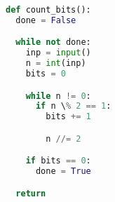 \begin{lstlisting}[language=Python,caption={Python example of complexity},label={lst:sample_python},showstringspaces=false]
def count_bits():
  done = False

  while not done:
    inp = input()
    n = int(inp)
    bits = 0

    while n != 0:
      if n \% 2 == 1:
        bits += 1

        n //= 2

    if bits == 0:
      done = True

  return
\end{lstlisting}
